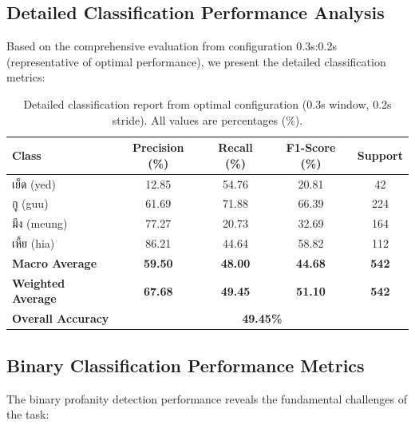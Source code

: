 \documentclass[11pt]{article}
\newcommand{\textthai}[1]{{\thaifont #1}}
\begin{document}
\subsection{Detailed Classification Performance Analysis}
Based on the comprehensive evaluation from configuration 0.3s:0.2s (representative of optimal performance), we present the detailed classification metrics:

\begin{table}[H]
    \caption{Detailed classification report from optimal configuration (0.3s window, 0.2s stride). All values are percentages (\%).}
    \centering
    \label{tab:detailed-classification}
    \footnotesize
    \begin{tabular}{|l|c|c|c|c|}
        \hline
        \textbf{Class} & \textbf{Precision (\%)} & \textbf{Recall (\%)} & \textbf{F1-Score (\%)} & \textbf{Support} \\
        \hline
        \textthai{เย็ด} (yed) & 12.85 & 54.76 & 20.81 & 42 \\
        \textthai{กู} (guu) & 61.69 & 71.88 & 66.39 & 224 \\
        \textthai{มึง} (meung) & 77.27 & 20.73 & 32.69 & 164 \\
        \textthai{เหี้ย} (hia) & 86.21 & 44.64 & 58.82 & 112 \\
        \hline
        \textbf{Macro Average} & \textbf{59.50} & \textbf{48.00} & \textbf{44.68} & \textbf{542} \\
        \textbf{Weighted Average} & \textbf{67.68} & \textbf{49.45} & \textbf{51.10} & \textbf{542} \\
        \hline
        \textbf{Overall Accuracy} & \multicolumn{4}{c|}{\textbf{49.45\%}} \\
        \hline
    \end{tabular}
\end{table}

\subsection{Binary Classification Performance Metrics}
The binary profanity detection performance reveals the fundamental challenges of the task:
\end{document}
